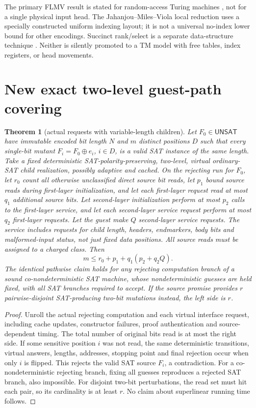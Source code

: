 \documentclass[11pt]{article}
\newtheorem{theorem}{Theorem}
\newcommand{\UNSAT}{\mathsf{UNSAT}}
\begin{document}
The primary FLMV result is stated for random-access Turing machines \cite{flmv}, not for a single physical input head. The Jahanjou--Miles--Viola local reduction \cite{jmv} uses a specially constructed uniform indexing layout; it is not a universal no-index lower bound for other encodings. Succinct rank/select is a separate data-structure technique \cite{raman}. Neither is silently promoted to a TM model with free tables, index registers, or head movements.

\section{New exact two-level guest-path covering}
\begin{theorem}[actual requests with variable-length children]\label{th:guest}
Let $F_0\in\UNSAT$ have immutable encoded bit length $N$ and $m$ distinct positions $D$ such that every single-bit mutant $F_i=F_0\oplus e_i$, $i\in D$, is a valid SAT instance of the \emph{same} length. Take a fixed deterministic SAT-polarity-preserving, two-level, virtual ordinary-SAT child realization, possibly adaptive and cached. On the rejecting run for $F_0$, let $r_0$ count all otherwise unclassified direct source bit reads, let $p_1$ bound source reads during first-layer initialization, and let each first-layer request read at most $q_1$ additional source bits. Let second-layer initialization perform at most $p_2$ calls to the first-layer service, and let each second-layer service request perform at most $q_2$ first-layer requests. Let the guest make $Q$ second-layer service requests. The service includes requests for child length, headers, endmarkers, body bits and malformed-input status, not just fixed data positions. All source reads must be assigned to a charged class. Then
\[
\boxed{m\le r_0+p_1+q_1(p_2+q_2Q).}
\tag{1}
\]
The identical pathwise claim holds for any rejecting computation branch of a \emph{sound} co-nondeterministic SAT machine, whose nondeterministic guesses are held fixed, with all SAT branches required to accept. If the source promise provides $r$ pairwise-disjoint SAT-producing two-bit mutations instead, the left side is $r$.
\end{theorem}
\begin{proof}
Unroll the actual rejecting computation and each virtual interface request, including cache updates, constructor failures, proof authentication and source-dependent timing. The total number of original bits read is at most the right side. If some sensitive position $i$ was not read, the same deterministic transitions, virtual answers, lengths, addresses, stopping point and final rejection occur when only $i$ is flipped. This rejects the valid SAT source $F_i$, a contradiction. For a co-nondeterministic rejecting branch, fixing all guesses reproduces a rejected SAT branch, also impossible. For disjoint two-bit perturbations, the read set must hit each pair, so its cardinality is at least $r$. No claim about superlinear running time follows.
\end{proof}
\end{document}

